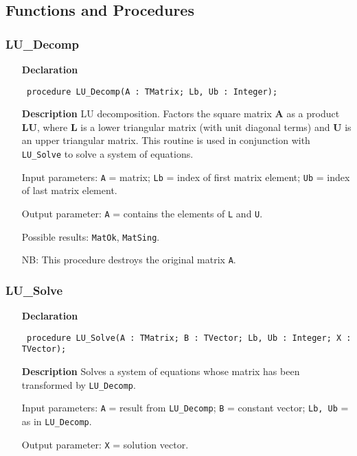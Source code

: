 \documentclass[12pt,a4paper,oneside]{report}
\newcommand{\declarationitem}[1]{\textbf{#1}}
\newcommand{\descriptiontitle}[1]{\textbf{#1}}
\newcommand{\code}[1]{\texttt{#1}}
\begin{document}
\subsection{Functions and Procedures}
\subsubsection{LU{\_}Decomp}
\label{ulu-LU_Decomp}
\begin{itemize}\item[\declarationitem{Declaration}\hfill]
	\begin{flushleft}
		\code{
			procedure LU{\_}Decomp(A : TMatrix; Lb, Ub : Integer);}
		
	\end{flushleft}
	
	\par
	\item[\descriptiontitle{Description}]
	LU decomposition. Factors the square matrix \textbf{A} as a product \textbf{LU}, where \textbf{L} is a lower triangular matrix (with unit diagonal terms) and \textbf{U} is an upper triangular matrix. This routine is used in conjunction with \code{LU{\_}Solve} to solve a system of equations.
	
	Input parameters: \code{A} = matrix; \code{Lb} = index of first matrix element; \code{Ub} = index of last matrix element.
	
	Output parameter: \code{A} = contains the elements of \code{L} and \code{U}.
	
	Possible results: \code{MatOk}, \code{MatSing}.
	
	NB: This procedure destroys the original matrix \code{A}.
	
\end{itemize}
\subsubsection{LU{\_}Solve}
\label{ulu-LU_Solve}
\begin{itemize}\item[\declarationitem{Declaration}\hfill]
	\begin{flushleft}
		\code{
			procedure LU{\_}Solve(A : TMatrix; B : TVector; Lb, Ub : Integer; X : TVector);}
		
	\end{flushleft}
	
	\par
	\item[\descriptiontitle{Description}]
	Solves a system of equations whose matrix has been transformed by \code{LU{\_}Decomp}.
	
	Input parameters: \code{A} = result from \code{LU{\_}Decomp}; \code{B} = constant vector; \code{Lb, Ub} = as in \code{LU{\_}Decomp}.
	
	Output parameter: \code{X} = solution vector.
	
\end{itemize}
\end{document}
